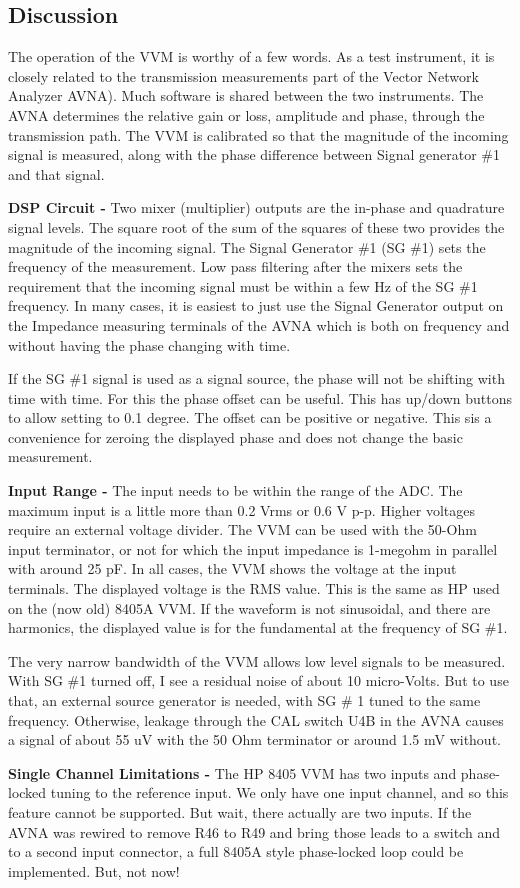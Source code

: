 \subsection{Discussion}
The operation of the VVM is worthy of a few words. As a test instrument, it is closely related to the transmission measurements part of the Vector Network Analyzer AVNA). Much software is shared between the two instruments. The AVNA determines the relative gain or loss, amplitude and phase, through the transmission path. The VVM is calibrated so that the magnitude of the incoming signal is measured, along with the phase difference between Signal generator \#1 and that signal.

\textbf{DSP Circuit - }Two mixer (multiplier) outputs are the in-phase and quadrature signal levels. The square root of the sum of the squares of these two provides the magnitude of the incoming signal. The Signal Generator \#1 (SG \#1) sets the frequency of the measurement. Low pass filtering after the mixers sets the requirement that the incoming signal must be within a few Hz of the SG \#1 frequency. In many cases, it is easiest to just use the Signal Generator output on the Impedance measuring terminals of the AVNA which is both on frequency and without having the phase changing with time.

If the SG \#1 signal is used as a signal source, the phase will not be shifting with time with time. For this the phase offset can be useful. This has up/down buttons to allow setting to 0.1 degree. The offset can be positive or negative. This sis a convenience for zeroing the displayed phase and does not change the basic measurement.

\textbf{Input Range - }The input needs to be within the range of the ADC. The maximum input is a little more than 0.2 Vrms or 0.6 V p-p.  Higher voltages require an external voltage divider.  The VVM can be used with the 50-Ohm input terminator, or not for which the input impedance is 1-megohm in parallel with around 25 pF.  In all cases, the VVM shows the voltage at the input terminals.  The displayed voltage is the RMS value.  This is the same as HP used on the (now  old) 8405A VVM.   If the waveform is not sinusoidal, and there are harmonics, the displayed value is for the fundamental at the frequency of SG \#1.

The very narrow bandwidth of the VVM allows low level signals to be measured.  With SG \#1 turned off, I see a residual noise of about 10 micro-Volts.  But to use that, an external source generator is needed, with SG \# 1 tuned to the same frequency.  Otherwise, leakage through the CAL switch U4B in the AVNA causes a signal of about 55 uV with the 50 Ohm terminator or around 1.5 mV without.

\textbf{Single Channel Limitations - }The HP 8405 VVM has two inputs and phase-locked tuning to the reference input.  We only have one input channel, and so this feature cannot be supported.  But wait, there actually are two inputs.  If the AVNA was rewired to remove R46 to R49 and bring those leads to a switch and to a second input connector, a full 8405A style phase-locked loop could be implemented.  But, not now!

